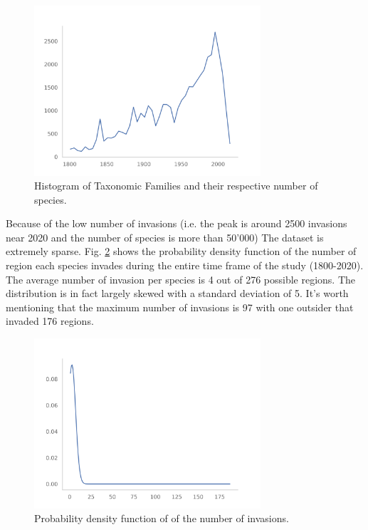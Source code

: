 \documentclass[mscthesis]{usiinfthesis}
\begin{document}
\begin{figure}[H]
    \centering
    \includegraphics[width=0.75\textwidth]{invasion_per_year.png}
    \caption{Histogram of Taxonomic Families and their respective number of species.}
    \label{fig:invasion_per_year}
\end{figure}


Because of the low number of invasions (i.e. the peak is around 2500 invasions near 2020 and the number of species is more than 50'000) The dataset is extremely sparse. Fig. \ref{fig:pdf_invasion} shows the probability density function of the number of region each species invades during the entire time frame of the study (1800-2020).  The average number of invasion per species is 4 out of 276 possible regions. The distribution is in fact largely skewed with a standard deviation of 5. It's worth mentioning that the maximum number of invasions is 97 with one outsider that invaded 176 regions.

\begin{figure}[H]
    \centering
    \includegraphics[width=0.75\textwidth]{species_region_invasion.png}
    \caption{Probability density function of of the number of invasions.}
    \label{fig:pdf_invasion}
\end{figure}
\end{document}
